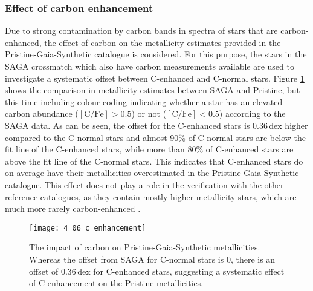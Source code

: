 \documentclass[a4paper,11pt]{article}
\begin{document}
\subsubsection*{Effect of carbon enhancement}
Due to strong contamination by carbon bands in spectra of stars that are carbon-enhanced, the effect of carbon on the metallicity estimates provided in the Pristine-Gaia-Synthetic catalogue is considered. For this purpose, the stars in the SAGA crossmatch which also have carbon measurements available are used to investigate a systematic offset between C-enhanced and C-normal stars. Figure \ref{fig:c_enhancement} shows the comparison in metallicity estimates between SAGA and Pristine, but this time including colour-coding indicating whether a star has an elevated carbon abundance ($\mathrm{[C/Fe]}>0.5$) or not ($\mathrm{[C/Fe]}<0.5$) according to the SAGA data. As can be seen, the offset for the C-enhanced stars is 0.36\,dex higher compared to the C-normal stars and almost 90\% of C-normal stars are below the fit line of the C-enhanced stars, while more than 80\% of C-enhanced stars are above the fit line of the C-normal stars. This indicates that C-enhanced stars do on average have their metallicities overestimated in the Pristine-Gaia-Synthetic catalogue. This effect does not play a role in the verification with the other reference catalogues, as they contain mostly higher-metallicity stars, which are much more rarely carbon-enhanced \citep[e.g.,][]{arentsen22}.
%
\begin{figure}
 \centering
 \texttt{[image: 4\_06\_c\_enhancement]}
 \caption[Impact of carbon on Pristine metallicities]{The impact of carbon on Pristine-Gaia-Synthetic metallicities. Whereas the offset from SAGA for C-normal stars is 0, there is an offset of 0.36\,dex for C-enhanced stars, suggesting a systematic effect of C-enhancement on the Pristine metallicities.}
 \label{fig:c_enhancement}
\end{figure}\\ \\
%
\end{document}
